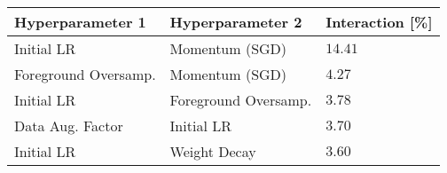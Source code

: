 \begin{tabular}{lll}
\toprule
Hyperparameter 1 & Hyperparameter 2 & Interaction [\%] \\
\midrule
Initial LR & Momentum (SGD) & $14.41$ \\
Foreground Oversamp. & Momentum (SGD) & $4.27$ \\
Initial LR & Foreground Oversamp. & $3.78$ \\
Data Aug. Factor & Initial LR & $3.70$ \\
Initial LR & Weight Decay & $3.60$ \\
\bottomrule
\end{tabular}
